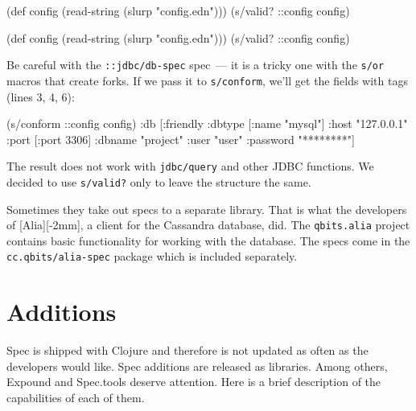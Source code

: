 \ifx\DEVICETYPE\MOBILE

\begin{english}
  \begin{clojure}
(def config
  (read-string (slurp "config.edn")))
(s/valid? ::config config)
  \end{clojure}
\end{english}

\else

\begin{english}
  \begin{clojure}
(def config (read-string (slurp "config.edn")))
(s/valid? ::config config)
  \end{clojure}
\end{english}

\fi

\label{jdbc-conform-warning}


Be careful with the \verb|::jdbc/db-spec| spec~--- it is a tricky one with the \verb|s/or| macros that create forks. If we pass it to \verb|s/conform|, we'll get the fields with tags (lines 3, 4, 6):

\begin{english}
  \begin{clojure/lines}
(s/conform ::config config)
{:db
 [:friendly
  {:dbtype   [:name "mysql"]
   :host     "127.0.0.1"
   :port     [:port 3306]
   :dbname   "project"
   :user     "user"
   :password "********"}]}
  \end{clojure/lines}
\end{english}

The result does not work with \verb|jdbc/query| and other JDBC functions. We decided to use \verb|s/valid?| only to leave the structure the same.

Sometimes they take out specs to a separate library. That is what the developers of [Alia][-2mm], a client for the Cassandra database, did. The \verb|qbits.alia| project contains basic functionality for working with the database. The specs come in the \verb|cc.qbits/alia-spec| package which is included separately.

\section{Additions}

Spec is shipped with Clojure and therefore is not updated as often as the developers would like. Spec additions are released as libraries. Among others, Expound and Spec.tools deserve attention. Here is a brief description of the capabilities of each of them.

